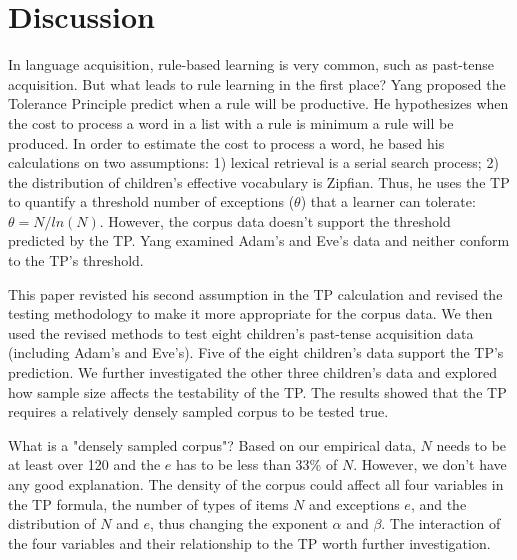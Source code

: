 \section{Discussion}
In language acquisition, rule-based learning is very common, such as past-tense acquisition. But what leads to rule learning in the first place? Yang proposed the Tolerance Principle predict when a rule will be productive. He hypothesizes when the cost to process a word in a list with a rule is minimum a rule will be produced. In order to estimate the cost to process a word, he based his calculations on two assumptions: 1) lexical retrieval is a serial search process; 2) the distribution of children's effective vocabulary is Zipfian. Thus, he uses the TP to quantify a threshold number of exceptions ($\theta$) that a learner can tolerate: $\theta = N/ln(N)$. However, the corpus data doesn't support the threshold predicted by the TP. Yang examined Adam's and Eve's data and neither conform to the TP's threshold. 

This paper revisted his second assumption in the TP calculation and revised the testing methodology to make it more appropriate for the corpus data. We then used the revised methods to test eight children's past-tense acquisition data (including Adam's and Eve's). Five of the  eight children's data support the TP's prediction. We further investigated the other three children's data and explored how sample size affects the testability of the TP. The results showed that the TP requires a relatively densely sampled corpus to be tested true. 

What is a "densely sampled corpus"? Based on our empirical data, $N$ needs to be at least over 120 and the $e$ has to be less than 33\% of $N$. However, we don't have any good explanation. The density of the corpus could affect all four variables in the TP formula, the number of types of items $N$ and exceptions $e$, and the distribution of $N$ and $e$, thus changing the exponent $\alpha$ and $\beta$. The interaction of the four variables and their relationship to the TP worth further investigation.  